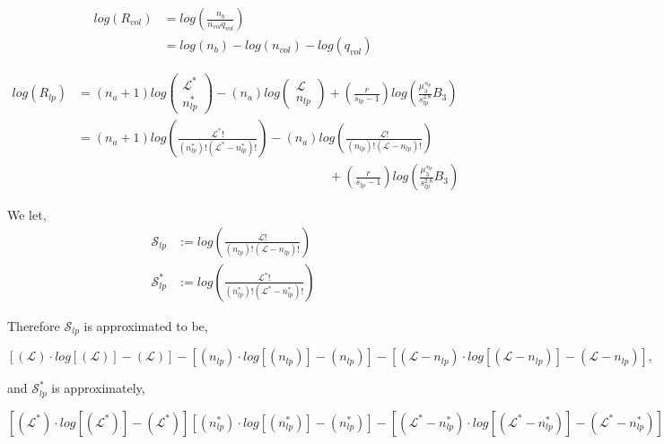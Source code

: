 \documentclass[12pt,letterpaper]{article}
\newcommand{\leng}{\mathcal{L}}
\newcommand{\lr}[1]{\left( #1 \right)}
\newcommand{\lrb}[1]{\left[ #1 \right]}
\newcommand{\schw}{\ensuremath{\mathscr{S}}}
\newcommand{\stirl}[1]{
    \ensuremath{
        \left(
            #1
        \right)
        \cdotp 
        log
        \left[
            \left(
            #1
            \right)
        \right]
        -
        \left(
            #1
        \right)
    }
}
\newcommand{\facto}[2]{
    \ensuremath{
        \frac{
        #1!
        }{
        \lr{
        #2
        }!
        \lr{
        #1
        -
        #2
        }!
        }
    }
}
\begin{document}
\begin{align}
     log
     \lr{
        R_{vol}
    }
    &=
    log
    \lr{
    	\frac{
		    n_b
		}{
		    n_{vol} q_{vol}
		}
    }\\
    &=
    log
    \lr{
        n_b
    }
    -
    log
    \lr{
        n_{vol}
    }
    -
    log
    \lr{
        q_{vol}
    }    
\end{align}

\begin{align}
\label{eq.LogRvol1}
log
\lr{
    R_{lp}
}
&=
\lr{n_a+1}   
log
\lr{
    \begin{array}{c}
    \leng^{*}\\
    n_{lp}^{*} 
    \end{array}
}
-
\lr{n_a}
log
\lr{
\begin{array}{c}
     \leng\\
     n_{lp}
\end{array}
}
+
\lr{
    \frac{
        r
    }{
        s_{lp}-1
    }
}
log
\lr{
    \frac{
        \mu_3^{
            s_{lp}
        }
    }{
        s_{lp}^{2.8}
    }
    B_3
}
\nonumber\\
&=
\lr{n_a+1}   
log
\lr{
    \facto{
        \leng^{*}
    }{
        n_{lp}^{*}
    }
}
-
\lr{n_a}
log
\lr{
    \facto{
        \leng
    }{
        n_{lp}
    }
}
\\
&\qquad\qquad\qquad
\qquad\qquad\qquad
\qquad\qquad\qquad
\qquad
+
\lr{
    \frac{
        r
    }{
        s_{lp}-1
    }
}
log
\lr{
    \frac{
        \mu_3^{
            s_{lp}
        }
    }{
        s_{lp}^{2.8}
    }
    B_3
}\nonumber
\end{align}

We let, 
\begin{align}
\schw_{lp}
&:=
log
\lr{
\facto{
    \leng
}{
    n_{lp}
}
}\\
\schw^{*}_{lp}
&:=
log
\lr{
\facto{
    \leng^{*}
}{
    n_{lp}^{*}
}
}
\end{align}

Therefore 
$
\schw_{lp}
$ 
is approximated to be,

\begin{equation}
\lrb{
    \stirl{
        \leng
    }
}
-
\lrb{
    \stirl{
        n_{lp}
    }
}
-
\lrb{
    \stirl{
        \leng
        -
        n_{lp}
    }
},
\end{equation}

and 
$
\schw^{*}_{lp}
$ 
is approximately,

\begin{equation}
\lrb{
    \stirl{
        \leng^{*}
    }
}
\lrb{
    \stirl{
        n_{lp}^{*}
    }
}
-
\lrb{
    \stirl{
        \leng^{*}
        -
        n_{lp}^{*}
    }
}
\end{equation}
\end{document}
